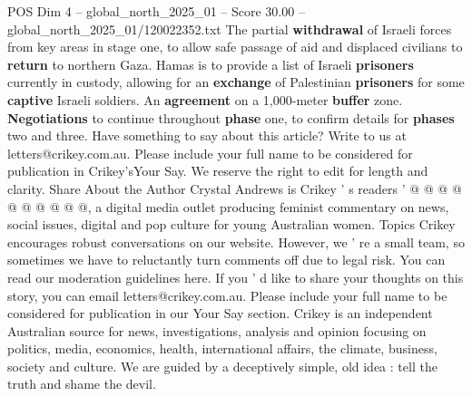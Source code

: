 \begin{textsample}{POS Dim 4 – global\_north\_2025\_01 – Score 30.00 – global\_north\_2025\_01/120022352.txt}
The partial \textbf{withdrawal} of Israeli forces from key areas in stage one, to allow safe passage of aid and displaced civilians to \textbf{return} to northern Gaza.
Hamas is to provide a list of Israeli \textbf{prisoners} currently in custody, allowing for an \textbf{exchange} of Palestinian \textbf{prisoners} for some \textbf{captive} Israeli soldiers.
An \textbf{agreement} on a 1,000-meter \textbf{buffer} zone. \textbf{Negotiations} to continue throughout \textbf{phase} one, to confirm details for \textbf{phases} two and three.
Have something to say about this article?
Write to us at letters@crikey.com.au.
Please include your full name to be considered for publication in Crikey'sYour Say.
We reserve the right to edit for length and clarity.
Share About the Author Crystal Andrews is Crikey ' s readers ' @ @ @ @ @ @ @ @ @ @, a digital media outlet producing feminist commentary on news, social issues, digital and pop culture for young Australian women.
Topics Crikey encourages robust conversations on our website.
However, we ' re a small team, so sometimes we have to reluctantly turn comments off due to legal risk.
You can read our moderation guidelines here.
If you ' d like to share your thoughts on this story, you can email letters@crikey.com.au.
Please include your full name to be considered for publication in our Your Say section.
Crikey is an independent Australian source for news, investigations, analysis and opinion focusing on politics, media, economics, health, international affairs, the climate, business, society and culture.
We are guided by a deceptively simple, old idea : tell the truth and shame the devil.

\end{textsample}
